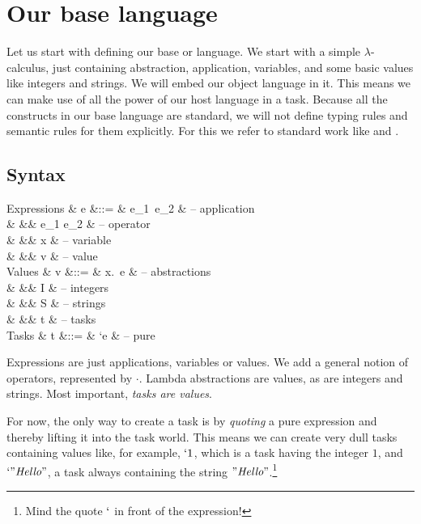 
\section{Our base language}

Let us start with defining our base or language.
We start with a simple $\lambda$-calculus,
just containing abstraction, application, variables,
and some basic values like integers and strings.
We will embed our object language in it.
This means we can make use of all the power of our host language in a task.
Because all the constructs in our base language are standard,
we will not define typing rules and semantic rules for them explicitly.
For this we refer to standard work like \textcite{Pierce:2002tp} and \textcite{Harper:2016uj}.


\subsection{Syntax}

\begin{grammar}
  Expressions
    & e &::= & e_1\ e_2       & – application \\
    &   &\mid& e_1 \cdot e_2  & – operator \\
    &   &\mid& x              & – variable \\
    &   &\mid& v              & – value \\
  Values
    & v &::= & \lambda x.\ e  & – abstractions \\
    &   &\mid& I              & – integers \\
    &   &\mid& S              & – strings \\
    &   &\mid& t              & – tasks \\
  Tasks
    & t &::= & `e             & – pure \\
\end{grammar}
Expressions are just applications, variables or values.
We add a general notion of operators, represented by $\cdot$.
Lambda abstractions are values, as are integers and strings.
Most important, \emph{tasks are values}.

For now, the only way to create a task is by \emph{quoting} a pure expression
and thereby lifting it into the task world.
This means we can create very dull tasks containing values like, for example, $`1$,
which is a task having the integer $1$,
and $`"\textit{Hello}"$, a task always containing the string $"\textit{Hello}"$.\footnote{
  Mind the quote $`$ in front of the expression!
}

